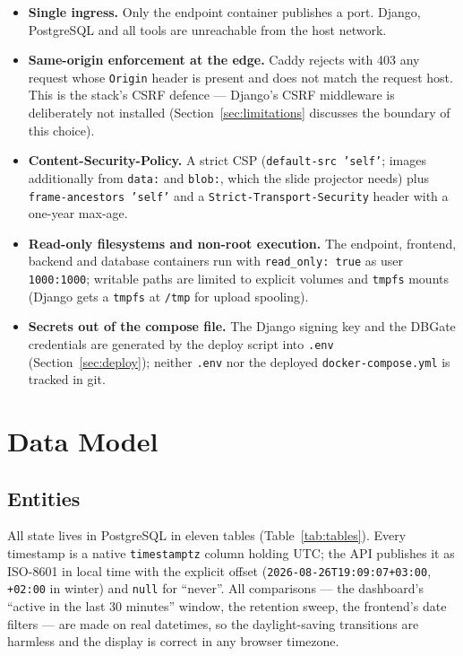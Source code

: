 \documentclass[11pt,a4paper]{article}
\newcommand{\code}[1]{\texttt{#1}}
\begin{document}
\begin{itemize}
  \item \textbf{Single ingress.} Only the endpoint container publishes
        a port. Django, PostgreSQL and all tools are unreachable from
        the host network.
  \item \textbf{Same-origin enforcement at the edge.} Caddy rejects
        with 403 any request whose \code{Origin} header is present and
        does not match the request host. This is the stack's CSRF
        defence --- Django's CSRF middleware is deliberately not
        installed (Section~\ref{sec:limitations} discusses the
        boundary of this choice).
  \item \textbf{Content-Security-Policy.} A strict CSP
        (\code{default-src 'self'}; images additionally from
        \code{data:} and \code{blob:}, which the slide projector
        needs) plus \code{frame-ancestors 'self'} and a
        \code{Strict-Transport-Security} header with a one-year
        max-age.
  \item \textbf{Read-only filesystems and non-root execution.} The
        endpoint, frontend, backend and database containers run with
        \code{read\_only: true} as user \code{1000:1000}; writable
        paths are limited to explicit volumes and \code{tmpfs} mounts
        (Django gets a \code{tmpfs} at \code{/tmp} for upload
        spooling).
  \item \textbf{Secrets out of the compose file.} The Django signing
        key and the DBGate credentials are generated by the deploy
        script into \code{.env} (Section~\ref{sec:deploy}); neither
        \code{.env} nor the deployed \code{docker-compose.yml} is
        tracked in git.
\end{itemize}

\section{Data Model}
\label{sec:datamodel}

\subsection{Entities}

All state lives in PostgreSQL in eleven tables
(Table~\ref{tab:tables}). Every timestamp is a native
\code{timestamptz} column holding UTC; the API publishes it as
ISO-8601 in local time with the explicit offset
(\code{2026-08-26T19:09:07+03:00}, \code{+02:00} in winter) and
\code{null} for ``never''. All comparisons --- the dashboard's
``active in the last 30 minutes'' window, the retention sweep, the
frontend's date filters --- are made on real datetimes, so the
daylight-saving transitions are harmless and the display is correct in
any browser timezone.
\end{document}
